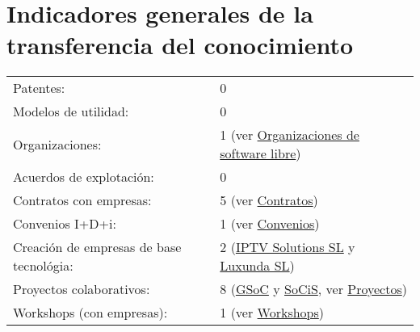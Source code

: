 \documentclass[a4paper]{article}
\begin{document}
\section*{Indicadores generales de la transferencia del conocimiento}
\begin{tabular}{ll}
Patentes: & 0 \\
Modelos de utilidad: & 0 \\
Organizaciones: & 1 (ver \hyperref[sec:organizations]{Organizaciones de software libre}) \\
Acuerdos de explotación: & 0 \\
Contratos con empresas: & 5 (ver \hyperref[sec:contratos]{Contratos})\\
Convenios I+D+i: & 1 (ver \hyperref[sec:convenios]{Convenios}) \\
Creación de empresas de base tecnológia: & 2 (\href{http://www.infocif.es/ficha-empresa/iptv-solutions-sl}{IPTV Solutions SL} y \href{http://www.luxunda.es/}{Luxunda SL})\\
Proyectos colaborativos: & 8 (\href{https://summerofcode.withgoogle.com}{GSoC} y \href{https://www.esa.int/Our_Activities/Space_Engineering_Technology/SOCIS_The_ESA_Summer_of_Code_in_Space}{SoCiS}, ver \hyperref[sec:proyectos]{Proyectos}) \\
Workshops (con empresas): & 1 (ver \hyperref[sec:workshops]{Workshops})
\end{tabular}

%
\end{document}
